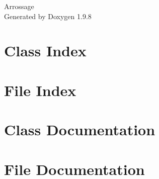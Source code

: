 \documentclass[twoside]{book}
\newcommand{\+}{\discretionary{\mbox{\scriptsize$\hookleftarrow$}}{}{}}
\newcommand{\clearemptydoublepage}{%
    \newpage{\pagestyle{empty}\cleardoublepage}%
  }
\begin{document}
  \raggedbottom
    \hypersetup{pageanchor=false,
                bookmarksnumbered=true,
                pdfencoding=unicode
               }
  \begin{titlepage}
  \vspace*{7cm}
  \begin{center}%
  {\Large Arrossage}\\
  \vspace*{1cm}
  {\large Generated by Doxygen 1.9.8}\\
  \end{center}
  \end{titlepage}
  \clearemptydoublepage
  \tableofcontents
  \clearemptydoublepage
  \hypersetup{pageanchor=true}
\chapter{Class Index}

\chapter{File Index}

\chapter{Class Documentation}



\chapter{File Documentation}




  \backmatter
  \newpage
  \clearemptydoublepage
  \printindex
\end{document}
